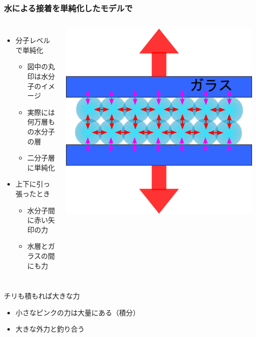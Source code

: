 \documentclass[unicode,12pt]{beamer}%
\begin{document}
\begin{frame}
	\frametitle{水による接着を単純化したモデルで}
		\begin{columns}[c, onlytextwidth]
			\begin{itemize}
				\item 分子レベルで単純化
				\begin{itemize}
					\item 図中の丸印は水分子のイメージ
					\item 実際には何万層もの水分子の層
					\item 二分子層に単純化
				\end{itemize}
				\item 上下に引っ張ったとき
				\begin{itemize}
					\item 水分子間に赤い矢印の力
					\item 水層とガラスの間にも力
				\end{itemize}
			\end{itemize}
			\centering
			\includegraphics[width=\textwidth]{glass_water.png}
		\end{columns}
		\begin{alertblock}{チリも積もれば大きな力}
			\begin{itemize}
				\item 小さなピンクの力は大量にある（積分）
				\item 大きな外力と釣り合う
			\end{itemize}
		\end{alertblock}
		
\end{frame}
\end{document}
